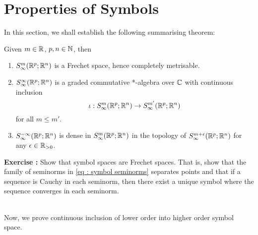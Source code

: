 \documentclass{article}
\begin{document}
\pagebreak
\section{Properties of Symbols}
In this section, we shall establish the following summarising theorem: 

\begin{ftheorem}[Summary]
    Given $m \in {\ensuremath {\mathbb R}}$, $p, n \in {\ensuremath {\mathbb N}}$, then
    \begin{enumerate}
        \item $S^{m}_\infty({\mathbb R}^{p}; {\mathbb R}^n)$ is a Frechet space, hence completely metrisable. 
        \item $S^{\infty}_\infty({\mathbb R}^{p}; {\mathbb R}^n)$ is a graded commutative *-algebra over ${\mathbb C}$ with continuous  inclusion  $$\iota : S^{m}_\infty({\mathbb R}^p; {\mathbb R}^n) \to S^{m'}_\infty({\mathbb R}^p; {\mathbb R}^n)$$ for all $m \leq m'$. 
        \item $S^{-\infty}_\infty({\mathbb R}^{p}; {\mathbb R}^n)$ is dense in $S^{m}_\infty({\mathbb R}^{p}; {\mathbb R}^n)$ in the topology of $S^{m + \epsilon}_\infty({\mathbb R}^{p}; {\mathbb R}^n)$ for any $\epsilon \in {\ensuremath {\mathbb R}}_{> 0}$. 
    \end{enumerate}

\end{ftheorem}

\begin{mdframed}
    \textbf{Exercise : } Show that symbol spaces are Frechet spaces. That is, show that the family of seminorms in \ref{eq : symbol seminorms} separates points and that if a sequence is Cauchy in each seminorm, then there exist a unique symbol where the sequence converges in each seminorm. 
\end{mdframed}
\hfill \\ [3em ]

Now, we prove continuous inclusion of lower order into higher order symbol space. 
\end{document}
